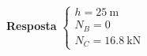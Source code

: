 
\textbf{Resposta}
$
\begin{cases}
	h=\SI{25}{\meter}\\
	N_{B}=0\\
	N_{C}=\SI{16.8}{\kilo\newton}
\end{cases}
$